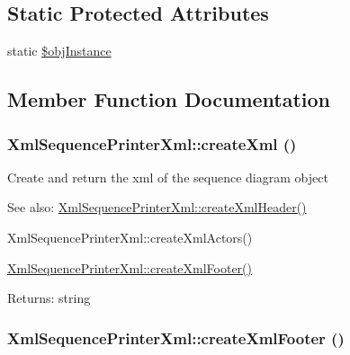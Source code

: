 \subsection*{Static Protected Attributes}
\begin{CompactItemize}
\item 
static \hyperlink{class_xml_sequence_printer_xml_e633ac1e15f76e165c7a6d599de36231}{\$objInstance}
\end{CompactItemize}


\subsection{Member Function Documentation}
\hypertarget{class_xml_sequence_printer_xml_15a782830da7eeff1fc9746d223452ac}{
\subsubsection[{createXml}]{\setlength{\rightskip}{0pt plus 5cm}XmlSequencePrinterXml::createXml ()}}
\label{class_xml_sequence_printer_xml_15a782830da7eeff1fc9746d223452ac}


Create and return the xml of the sequence diagram object

\begin{Desc}
\item[See also:]\hyperlink{class_xml_sequence_printer_xml_534160e28dc8623f138311e4a73be081}{XmlSequencePrinterXml::createXmlHeader()} 

XmlSequencePrinterXml::createXmlActors() 

\hyperlink{class_xml_sequence_printer_xml_774ffc0433f81a35080033382a39d525}{XmlSequencePrinterXml::createXmlFooter()} \end{Desc}
\begin{Desc}
\item[Returns:]string \end{Desc}
\hypertarget{class_xml_sequence_printer_xml_774ffc0433f81a35080033382a39d525}{
\subsubsection[{createXmlFooter}]{\setlength{\rightskip}{0pt plus 5cm}XmlSequencePrinterXml::createXmlFooter ()}}
\label{class_xml_sequence_printer_xml_774ffc0433f81a35080033382a39d525}


